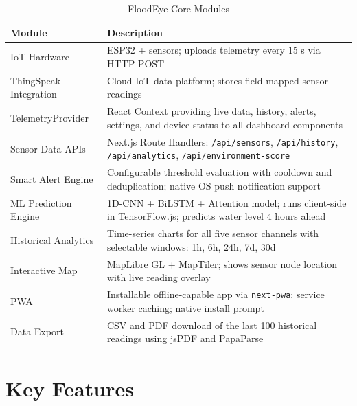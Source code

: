 \begin{table}[H]
\centering
\caption{FloodEye Core Modules}
\begin{tabularx}{\linewidth}{|l|X|}
\hline
\rowcolor{FloodLight}
\textbf{Module} & \textbf{Description} \\
\hline
IoT Hardware & ESP32 + sensors; uploads telemetry every 15 s via HTTP POST \\
\hline
ThingSpeak Integration & Cloud IoT data platform; stores field-mapped sensor readings \\
\hline
TelemetryProvider & React Context providing live data, history, alerts, settings, and device status to all dashboard components \\
\hline
Sensor Data APIs & Next.js Route Handlers: \texttt{/\allowbreak{}api/\allowbreak{}sensors}, \texttt{/\allowbreak{}api/\allowbreak{}history}, \texttt{/\allowbreak{}api/\allowbreak{}analytics}, \texttt{/\allowbreak{}api/\allowbreak{}environment-score} \\
\hline
Smart Alert Engine & Configurable threshold evaluation with cooldown and deduplication; native OS push notification support \\
\hline
ML Prediction Engine & 1D-CNN + BiLSTM + Attention model; runs client-side in TensorFlow.js; predicts water level 4 hours ahead \\
\hline
Historical Analytics & Time-series charts for all five sensor channels with selectable windows: 1h, 6h, 24h, 7d, 30d \\
\hline
Interactive Map & MapLibre GL + MapTiler; shows sensor node location with live reading overlay \\
\hline
PWA & Installable offline-capable app via \texttt{next-pwa}; service worker caching; native install prompt \\
\hline
Data Export & CSV and PDF download of the last 100 historical readings using jsPDF and PapaParse \\
\hline
\end{tabularx}
\end{table}

\section{Key Features}

